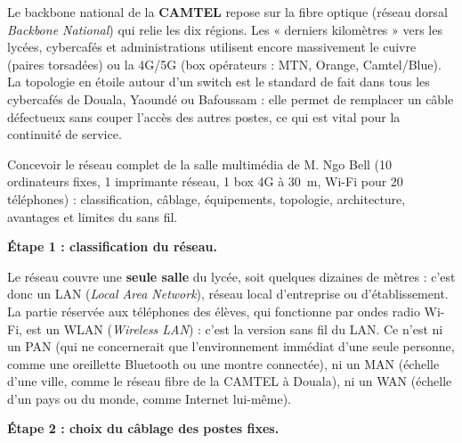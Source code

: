 \documentclass[11pt]{article}
\newcommand{\cle}[1]{{\popxbold\color{popdark}#1}}
\newcounter{popsec}
\newcounter{popsub}
\newcommand{\courssub}[1]{%
  \stepcounter{popsub}%
  \par\vspace{9pt}\noindent{\popxbold\fontsize{11.5}{13}\selectfont\color{popink}{\color{poporange}\thepopsec.\thepopsub}\hspace{6pt}#1}\par\nopagebreak\vspace{4pt}
}
\begin{document}
\begin{savaistu}
Le backbone national de la \textbf{CAMTEL} repose sur la fibre optique (réseau dorsal \emph{Backbone National}) qui relie les dix régions. Les « derniers kilomètres » vers les lycées, cybercafés et administrations utilisent encore massivement le cuivre (paires torsadées) ou la 4G/5G (box opérateurs : MTN, Orange, Camtel/Blue). La topologie en étoile autour d'un switch est le standard de fait dans tous les cybercafés de Douala, Yaoundé ou Bafoussam : elle permet de remplacer un câble défectueux sans couper l'accès des autres postes, ce qui est vital pour la continuité de service.
\end{savaistu}

\courssub{Démarche et corrigé commenté}

\begin{exoresolu}
Concevoir le réseau complet de la salle multimédia de M. Ngo Bell (10 ordinateurs fixes, 1 imprimante réseau, 1 box 4G à \SI{30}{m}, Wi-Fi pour 20 téléphones) : classification, câblage, équipements, topologie, architecture, avantages et limites du sans fil.

\tcblower

\textbf{Étape 1 : classification du réseau.}

Le réseau couvre une \textbf{seule salle} du lycée, soit quelques dizaines de mètres : c'est donc un \cle{LAN} (\emph{Local Area Network}), réseau local d'entreprise ou d'établissement. La partie réservée aux téléphones des élèves, qui fonctionne par ondes radio Wi-Fi, est un \cle{WLAN} (\emph{Wireless LAN}) : c'est la version sans fil du LAN. Ce n'est ni un PAN (qui ne concernerait que l'environnement immédiat d'une seule personne, comme une oreillette Bluetooth ou une montre connectée), ni un MAN (échelle d'une ville, comme le réseau fibre de la CAMTEL à Douala), ni un WAN (échelle d'un pays ou du monde, comme Internet lui-même).

\textbf{Étape 2 : choix du câblage des postes fixes.}


\end{exoresolu}
\end{document}
